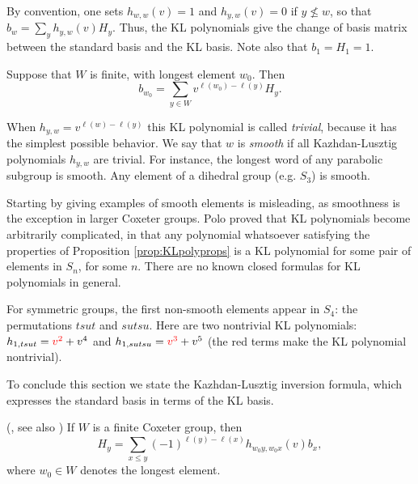 By convention, one sets $h_{w,w}(v) = 1$ and $h_{y,w}(v) = 0$ if $y \nleq w$, so that $b_w = \sum_y h_{y,w}(v)H_y$. Thus, the KL polynomials give the change of basis matrix between the standard basis and the KL basis. Note also that $b_1 = H_1 = 1$.
	
\begin{ex} Suppose that $W$ is finite, with longest element $w_0$. Then \[b_{w_0} = \sum_{y \in W} v^{\ell(w_0) - \ell(y)} H_y.\]  \end{ex}
	
When $h_{y,w} = v^{\ell(w)-\ell(y)}$ this KL polynomial is called \emph{trivial}, because it has the simplest possible behavior. We say that $w$ is \emph{smooth} if all Kazhdan-Lusztig
polynomials $h_{y,w}$ are trivial. For instance, the longest word of any parabolic subgroup is smooth. Any element of a dihedral group (e.g. $S_3$) is smooth.

Starting by giving examples of smooth elements is misleading, as smoothness is the exception in larger Coxeter groups. Polo \cite{Polo} proved that KL polynomials become arbitrarily
complicated, in that any polynomial whatsoever satisfying the properties of Proposition \ref{prop:KLpolyprops} is a KL polynomial for some pair of elements in $S_n$, for some $n$. There
are no known closed formulas for KL polynomials in general.

\begin{ex} \label{ex:notsmooth} For symmetric groups, the first non-smooth elements appear in $S_4$: the permutations $tsut$ and $sutsu$. Here are two nontrivial KL polynomials:
$h_{1,tsut} = {\color{red} v^2} + v^4$ and $h_{1,sutsu} = {\color{red} v^3} + v^5$ (the red terms make the KL polynomial nontrivial). \end{ex}

To conclude this section we state the Kazhdan-Lusztig inversion formula, which expresses the standard basis in terms of the KL basis.

\begin{prop}\label{prop:KLinversion} (\cite[Theorem 3.1]{KazLus79}, see also \cite[Remark 3.10]{Soer97})
If $W$ is a finite Coxeter group, then
\begin{equation} \label{eq:KLinversion} H_y = \sum_{x\leq y} (-1)^{\ell(y)-\ell(x)}h_{w_0y,w_0x}(v) b_x, \end{equation}
where $w_0\in W$ denotes the longest element.
\end{prop}


